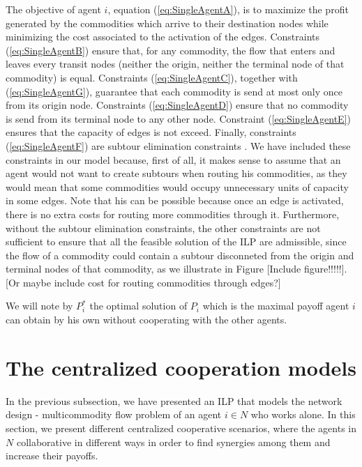 \documentclass[review]{elsarticle}
\begin{document}
The objective of agent $i$, equation (\ref{eq:SingleAgentA}), is to maximize the
profit generated by the commodities which arrive to their destination nodes
while minimizing the cost associated to the activation of the edges. Constraints
(\ref{eq:SingleAgentB}) ensure that, for any commodity, the flow that enters
and leaves every transit nodes (neither the origin, neither the terminal node of
that commodity) is equal. Constraints (\ref{eq:SingleAgentC}), together with
(\ref{eq:SingleAgentG}), guarantee that each commodity is send at most only once
from its origin node. Constraints (\ref{eq:SingleAgentD}) ensure that no
commodity is send from its terminal node to any other node. Constraint (\ref{eq:SingleAgentE})
ensures that the capacity of edges is not exceed. Finally, constraints
(\ref{eq:SingleAgentF}) are subtour elimination constraints \cite{AHUJA1993}. We have included these constraints in our model because, first of all, it makes sense to assume that an agent would not want to create subtours when routing his commodities, as they would mean that some commodities would occupy unnecessary units of capacity in some edges. Note that his can be possible because once an edge is activated, there is no extra costs for routing more commodities through it. Furthermore, without the subtour elimination constraints, the other constraints are not sufficient to ensure that all the feasible solution of the ILP are admissible, since the flow of a commodity could contain a subtour disconneted from the origin and terminal nodes of that commodity, as we illustrate in Figure [Include figure!!!!!]. [Or maybe include cost for routing commodities through edges?]

We will note by $P_i^*$ the optimal solution of $P_i$ which is the maximal
payoff agent $i$ can obtain by his own without cooperating with the other agents.

\section{The centralized cooperation models} \label{seq:centrmodels}

In the previous subsection, we have presented an ILP that models the network design - multicommodity flow problem of an agent $i\in N$ who works alone. In this section, we present different centralized cooperative scenarios, where the agents in $N$ collaborative in different ways in order to find synergies among them and increase their payoffs.
\end{document}
